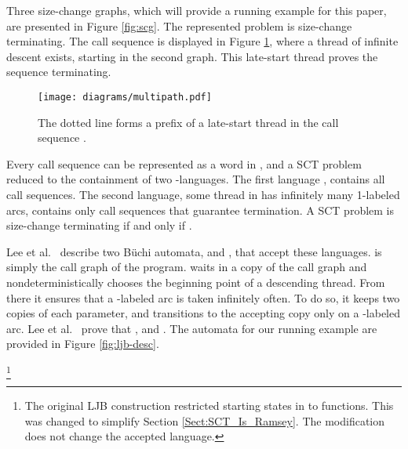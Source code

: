 \documentclass{LMCS}
\newcommand\buchi{B\"uchi }
\begin{document}
\begin{exa}
Three size-change graphs, which will provide a running example for this paper, are presented in
Figure \ref{fig:scg}. The represented problem is size-change terminating. The call sequence
 is displayed in Figure \ref{fig:late-start}, where a thread of infinite descent
exists, starting in the second graph. This late-start thread proves the sequence terminating.
\end{exa}



\begin{figure}[t]
\begin{center}
{\texttt{[image: diagrams/multipath.pdf]}}
\end{center}
\caption{The dotted line forms a prefix of a late-start thread in the call sequence .}\label{fig:late-start}
\end{figure}

Every call sequence can be represented as a word in , and a SCT
problem reduced to the containment of two -languages. The first language
, contains all
call sequences. The second language,  some
thread in  has infinitely many 1-labeled arcs, contains only call
sequences that guarantee termination. A SCT problem  is size-change
terminating if and only if .

Lee et al.~ \cite{LJB01} describe two \buchi automata,  and
, that accept these languages.  is simply the call
graph of the program.  waits in a copy of the call graph and
nondeterministically chooses the beginning point of a descending thread.  From
there it ensures that a -labeled arc is taken infinitely often. To do so, it
keeps two copies of each parameter, and transitions to the accepting copy only
on a -labeled arc.  Lee et al.~ prove that , and
. The automata for our running example are provided in Figure
\ref{fig:ljb-desc}.

\begin{defi}\label{LJB_Reduction} 
\footnote{The original LJB construction \cite{LJB01} restricted starting
states in to functions.  This was changed to simplify Section
\ref{Sect:SCT_Is_Ramsey}. The modification does not change the accepted
language.}\\

\begin{iteMize}{}
\item 
\end{iteMize}

\begin{iteMize}{}
\item 
\item  
\item 
\item 
\end{iteMize}
\end{defi} 
\end{document}

